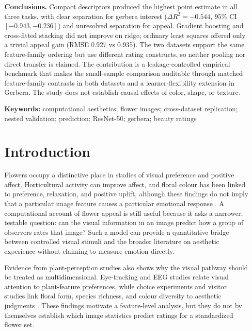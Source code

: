 \documentclass[10pt,letterpaper]{article}
\begin{document}
\textbf{Conclusions.} Compact descriptors produced the highest point estimate in all three tasks, with clear separation for gerbera interest ($\Delta R^2 = -0.544$, 95\% CI $[-0.943, -0.236]$) and unresolved separation for appeal. Gradient boosting and cross-fitted stacking did not improve on ridge; ordinary least squares offered only a trivial appeal gain (RMSE 0.927 vs 0.935). The two datasets support the same feature-family ordering but use different rating constructs, so neither pooling nor direct transfer is claimed.
The contribution is a leakage-controlled empirical benchmark that makes the small-sample comparison auditable through matched feature-family contrasts in both datasets and a learner-flexibility extension in Gerbera. The study does not establish causal effects of color, shape, or texture.

\noindent\textbf{Keywords:} computational aesthetics; flower images; cross-dataset replication; nested validation; prediction; ResNet-50; gerbera; beauty ratings

\clearpage
{}
\linenumbers

\section*{Introduction}
Flowers occupy a distinctive place in studies of visual preference and positive affect. Horticultural activity can improve affect, and floral colour has been linked to preference, relaxation, and positive uplift, although these findings do not imply that a particular image feature causes a particular emotional response \cite{tao2022,zhang2023}. A computational account of flower appeal is still useful because it asks a narrower, testable question: can the visual information in an image predict how a group of observers rates that image? Such a model can provide a quantitative bridge between controlled visual stimuli and the broader literature on aesthetic experience without claiming to measure emotion directly.

Evidence from plant-perception studies also shows why the visual pathway should be treated as multidimensional. Eye-tracking and EEG studies relate visual attention to plant-feature preferences, while choice experiments and visitor studies link floral form, species richness, and colour diversity to aesthetic judgments \cite{zheng2022,ding2022,hopkins2022,tomitaka2021}. These findings motivate a feature-level analysis, but they do not by themselves establish which image statistics predict ratings for a standardized flower set.
\end{document}
